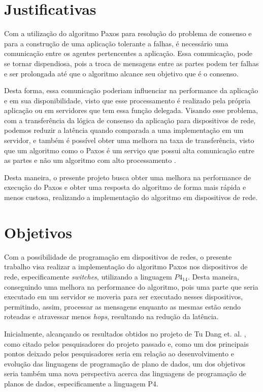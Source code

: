 \documentclass[12pt,
openright, 
oneside,
a4paper,
brazil]{facom-ufu-abntex2}
\theoremstyle{definition}
\begin{document}
\section{Justificativas}
Com a utilização do algoritmo Paxos para resolução do problema de consenso e para a 
construção de uma aplicação tolerante a falhas, é necessário uma comunicação entre os 
agentes pertencentes a aplicação. Essa comunicação, pode se tornar dispendiosa, pois 
a troca de mensagens entre as partes podem ter falhas e ser prolongada até que o 
algoritmo alcance seu objetivo que é o consenso.

Desta forma, essa comunicação poderiam influenciar na performance da aplicação e em 
sua disponibilidade, visto que esse processamento é realizado pela própria aplicação ou 
em servidores que tem essa função delegada. Visando esse problema, com a transferência
da lógica de consenso da aplicação para dispositivos de rede, podemos reduzir a latência
quando comparada a uma implementação em um servidor, e também é possível obter uma melhora
na taxa de transferência, visto que um algoritmo como o Paxos é um serviço que possui
alta comunicação entre as partes e não um algoritmo com alto processamento
\citep{netchainRtt}.

Desta maneira, o presente projeto busca obter uma melhora na performance de 
execução do Paxos e obter uma resposta do algoritmo de forma mais rápida e menos 
custosa, realizando a implementação do algoritmo em dispositivos de rede.

\section{Objetivos}
Com a possibilidade de programação em dispositivos de redes, o presente trabalho 
visa realizar a implementação do algoritmo Paxos nos dispositivos de rede, especificamente
\textit{switches}, utilizando a linguagem $P4_{14}$. 
Desta maneira, conseguindo uma melhora na performance do algoritmo, pois uma parte 
que seria executado em um servidor se moveria para ser executado nesses dispositivos, permitindo,
assim, processar as mensagens enquanto as mesmas estão sendo roteadas e atravessar menos
\textit{hops}, resultando na redução da latência.

Inicialmente, alcançando os resultados obtidos no projeto de Tu Dang et. al. 
\citep{dang2016paxos}, como citado pelos pesquisadores do projeto passado e, 
como um dos principais pontos deixado pelos pesquisadores seria em relação ao desenvolvimento
e evolução das linguagens de programação de plano de dados, um dos objetivos seria 
também uma nova perspectiva acerca das linguagens de programação de planos de dados, 
especificamente a linguagem P4.
\end{document}
